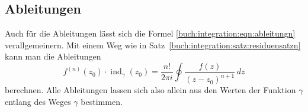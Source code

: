 %
%
%
\subsection{Ableitungen}
Auch für die Ableitungen lässt sich die Formel
\eqref{buch:integration:eqn:ableitungn}
verallgemeinern.
Mit einem Weg wie in Satz~\ref{buch:integration:satz:residuensatzn}
kann man die Ableitungen
\[
f^{(n)}(z_0)
\cdot
\operatorname{ind}_\gamma(z_0)
=
\frac{n!}{2\pi i}
\oint
\frac{f(z)}{(z-z_0)^{n+1}}
\,dz
\]
berechnen.
Alle Ableitungen lassen sich also allein aus den Werten der Funktion
$\gamma$ entlang des Weges $\gamma$ bestimmen.




